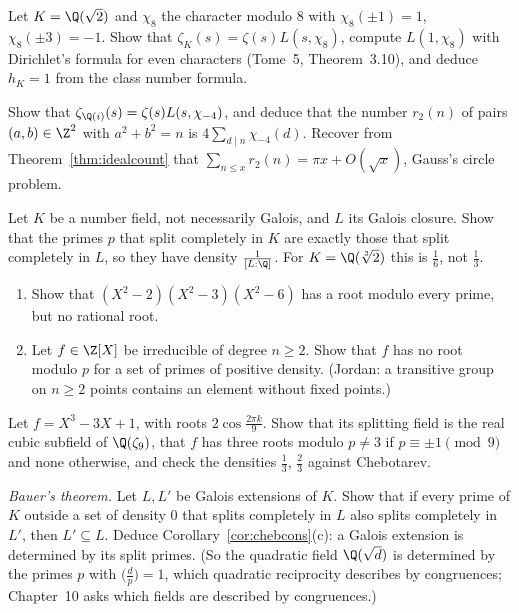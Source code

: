 \begin{exercise}[$\star\star$]\label{ex:sqrt2}
Let $K=\Q(\sqrt2)$ and $\chi_8$ the character modulo $8$ with $\chi_8(\pm1)=1$, $\chi_8(\pm3)=-1$. Show that $\zeta_K(s)=\zeta(s)L(s,\chi_8)$, compute
$L(1,\chi_8)$ with Dirichlet's formula for even characters (Tome~5, Theorem~3.10), and deduce $h_K=1$ from the class number formula.
\end{exercise}

\begin{exercise}[$\star\star$]\label{ex:twosq}
Show that $\zeta_{\Q(i)}(s)=\zeta(s)L(s,\chi_{-4})$, and deduce that the number $r_2(n)$ of pairs $(a,b)\in\Z^2$ with $a^2+b^2=n$ is
$4\sum_{d\mid n}\chi_{-4}(d)$. Recover from Theorem~\ref{thm:idealcount} that $\sum_{n\le x}r_2(n)=\pi x+O(\sqrt x)$, Gauss's circle problem.
\end{exercise}

\begin{exercise}[$\star\star$]\label{ex:splitdensity}
Let $K$ be a number field, not necessarily Galois, and $L$ its Galois closure. Show that the primes $p$ that split completely in $K$ are exactly those
that split completely in $L$, so they have density $\frac1{[L:\Q]}$. For $K=\Q(\sqrt[3]2)$ this is $\frac16$, not $\frac13$.
\end{exercise}

\begin{exercise}[$\star\star$]\label{ex:rootevery}
\begin{enumerate}[label=(\alph*)]
\item Show that $(X^2-2)(X^2-3)(X^2-6)$ has a root modulo every prime, but no rational root.
\item Let $f\in\Z[X]$ be irreducible of degree $n\ge2$. Show that $f$ has no root modulo $p$ for a set of primes of positive density. (Jordan: a
transitive group on $n\ge2$ points contains an element without fixed points.)
\end{enumerate}
\end{exercise}

\begin{exercise}[$\star\star$]\label{ex:cycliccubic}
Let $f=X^3-3X+1$, with roots $2\cos\frac{2\pi k}9$. Show that its splitting field is the real cubic subfield of $\Q(\zeta_9)$, that $f$ has three roots
modulo $p\ne3$ if $p\equiv\pm1\pmod9$ and none otherwise, and check the densities $\frac13$, $\frac23$ against Chebotarev.
\end{exercise}

\begin{exercise}[$\star\star\star$]\label{ex:bauer}
\emph{Bauer's theorem.} Let $L,L'$ be Galois extensions of $K$. Show that if every prime of $K$ outside a set of density $0$ that splits completely in
$L$ also splits completely in $L'$, then $L'\subseteq L$. Deduce Corollary~\ref{cor:chebcons}(c): a Galois extension is determined by its split
primes. (So the quadratic field $\Q(\sqrt d)$ is determined by the primes $p$ with $\bigl(\frac dp\bigr)=1$, which quadratic reciprocity describes by
congruences; Chapter~10 asks which fields are described by congruences.)
\end{exercise}


